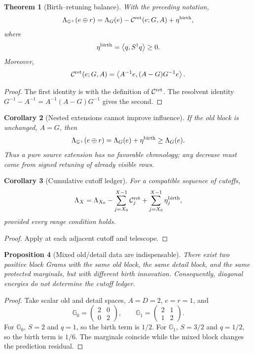 \documentclass[11pt]{article}
\newtheorem{theorem}{Theorem}[section]
\newtheorem{proposition}[theorem]{Proposition}
\newtheorem{corollary}[theorem]{Corollary}
\theoremstyle{definition}
\theoremstyle{remark}
\newcommand{\ip}[2]{\left\langle#1,#2\right\rangle}
\begin{document}
\begin{theorem}[Birth--retuning balance]
\label{thm:gran-birth-retuning}
With the preceding notation,
\[
 \Lambda_{\mathbb G^+}(e\oplus r)
 =\Lambda_G(e)
  -\mathcal C^{\rm ret}(e;G,A)
  +\eta^{\rm birth},
\]
where
\[
 \eta^{\rm birth}=\ip{q}{S^\dagger q}\ge0.
\]
Moreover,
\[
 \mathcal C^{\rm ret}(e;G,A)
 =\ip{A^{-1}e}{(A-G)G^{-1}e}.
\]
\end{theorem}

\begin{proof}
The first identity is  with the definition of
$\mathcal C^{\rm ret}$.  The resolvent identity
$G^{-1}-A^{-1}=A^{-1}(A-G)G^{-1}$ gives the second.
\end{proof}

\begin{corollary}[Nested extensions cannot improve influence]
If the old block is unchanged, $A=G$, then
\[
 \Lambda_{\mathbb G^+}(e\oplus r)=\Lambda_G(e)+\eta^{\rm birth}
 \ge\Lambda_G(e).
\]
Thus a pure source extension has no favorable chronology; any decrease must
come from signed retuning of already visible rows.
\end{corollary}

\begin{corollary}[Cumulative cutoff ledger]
For a compatible sequence of cutoffs,
\[
 \Lambda_X
 =\Lambda_{X_0}
  -\sum_{j=X_0}^{X-1}\mathcal C_j^{\rm ret}
  +\sum_{j=X_0}^{X-1}\eta_j^{\rm birth},
\]
provided every range condition holds.
\end{corollary}

\begin{proof}
Apply  at each adjacent cutoff and telescope.
\end{proof}

\begin{proposition}[Mixed old/detail data are indispensable]
There exist two positive block Grams with the same old block, the same detail
block, and the same protected marginals, but with different birth innovation.
Consequently, diagonal energies do not determine the cutoff ledger.
\end{proposition}

\begin{proof}
Take scalar old and detail spaces, $A=D=2$, $e=r=1$, and
\[
 \mathbb G_0=\begin{pmatrix}2&0\\0&2\end{pmatrix},
 \qquad
 \mathbb G_1=\begin{pmatrix}2&1\\1&2\end{pmatrix}.
\]
For $\mathbb G_0$, $S=2$ and $q=1$, so the birth term is $1/2$.
For $\mathbb G_1$, $S=3/2$ and $q=1/2$, so the birth term is $1/6$.
The marginals coincide while the mixed block changes the prediction residual.
\end{proof}
\end{document}
